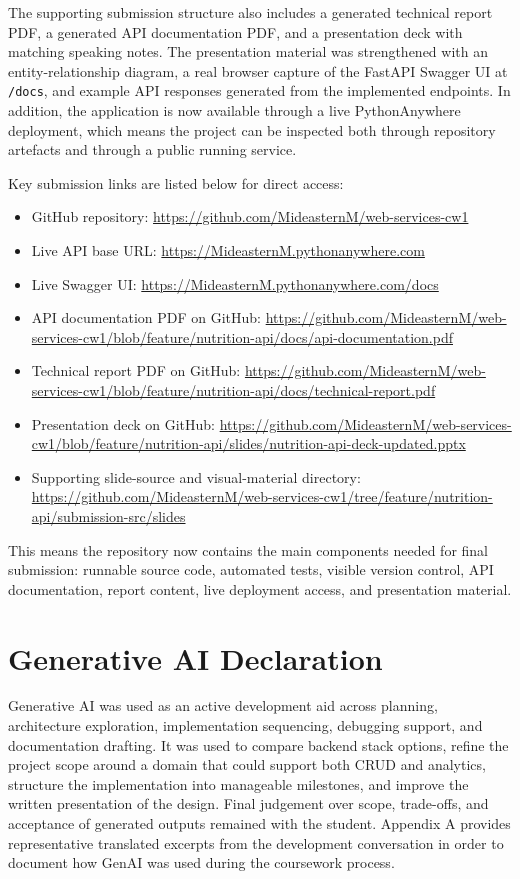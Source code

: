 \documentclass[11pt,a4paper]{article}
\begin{document}
The supporting submission structure also includes a generated technical report PDF, a generated API documentation PDF, and a presentation deck with matching speaking notes. The presentation material was strengthened with an entity-relationship diagram, a real browser capture of the FastAPI Swagger UI at \texttt{/docs}, and example API responses generated from the implemented endpoints. In addition, the application is now available through a live PythonAnywhere deployment, which means the project can be inspected both through repository artefacts and through a public running service.

Key submission links are listed below for direct access:
\begin{itemize}
    \item GitHub repository: \url{https://github.com/MideasternM/web-services-cw1}
    \item Live API base URL: \url{https://MideasternM.pythonanywhere.com}
    \item Live Swagger UI: \url{https://MideasternM.pythonanywhere.com/docs}
    \item API documentation PDF on GitHub: \url{https://github.com/MideasternM/web-services-cw1/blob/feature/nutrition-api/docs/api-documentation.pdf}
    \item Technical report PDF on GitHub: \url{https://github.com/MideasternM/web-services-cw1/blob/feature/nutrition-api/docs/technical-report.pdf}
    \item Presentation deck on GitHub: \url{https://github.com/MideasternM/web-services-cw1/blob/feature/nutrition-api/slides/nutrition-api-deck-updated.pptx}
    \item Supporting slide-source and visual-material directory: \url{https://github.com/MideasternM/web-services-cw1/tree/feature/nutrition-api/submission-src/slides}
\end{itemize}

This means the repository now contains the main components needed for final submission: runnable source code, automated tests, visible version control, API documentation, report content, live deployment access, and presentation material.

\section{Generative AI Declaration}
Generative AI was used as an active development aid across planning, architecture exploration, implementation sequencing, debugging support, and documentation drafting. It was used to compare backend stack options, refine the project scope around a domain that could support both CRUD and analytics, structure the implementation into manageable milestones, and improve the written presentation of the design. Final judgement over scope, trade-offs, and acceptance of generated outputs remained with the student. Appendix A provides representative translated excerpts from the development conversation in order to document how GenAI was used during the coursework process.
\end{document}
